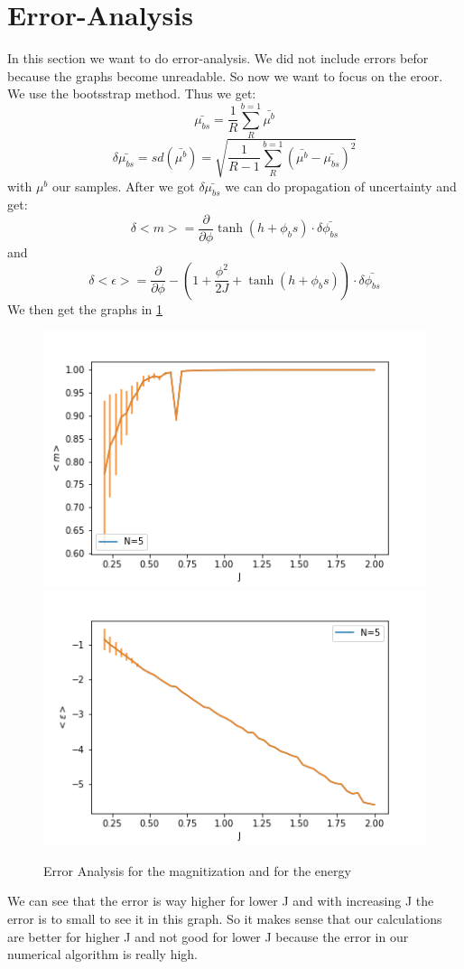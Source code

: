 \documentclass[11pt, a4paper, DIV=12]{scrartcl}
\begin{document}
\section{Error-Analysis}
In this section we want to do error-analysis. We did not include errors befor because the graphs become unreadable. So now we want to focus on the eroor. We use the bootsstrap method. Thus we get:
\begin{equation}
	\bar{\mu_{bs}}=\frac{1}{R}\sum_{R}^{b=1}\bar{\mu^b}
\end{equation}
\begin{equation}
\delta\bar{\mu_{bs}}= sd({\bar{\mu^b}})=\sqrt{\frac{1}{R-1}\sum_{R}^{b=1}(\bar{\mu^b}-\bar{\mu_{bs}})^2}
\end{equation}
with $\mu^b$ our samples. After we got $\delta\bar{\mu_{bs}}$ we can do propagation of uncertainty and get:
\begin{equation}
	\delta <m>=\frac{\partial }{\partial \phi} \tanh(h+\phi_bs)\cdot\delta\bar{\phi_{bs}}
\end{equation}
and
\begin{equation}
\delta <\epsilon>=\frac{\partial }{\partial \phi} -\left(1+\frac{\phi^2}{2J}+ \tanh(h+\phi_bs)\right)\cdot\delta\bar{\phi_{bs}}
\end{equation}
We then get the graphs in \ref{fig:error}
\begin{figure}[H]
	\centering
	\includegraphics[width=0.6\linewidth]{magnitization_error.png}\includegraphics[width=0.6\linewidth]{energy_error.png}
	\caption{Error Analysis for the magnitization and for the energy}
	\label{fig:error}
\end{figure}
We can see that the error is way higher for lower J and with increasing J the error is to small to see it in this graph. So it makes sense that our calculations are better for higher J and not good for lower J because the error in our numerical algorithm is really high.
\end{document}
